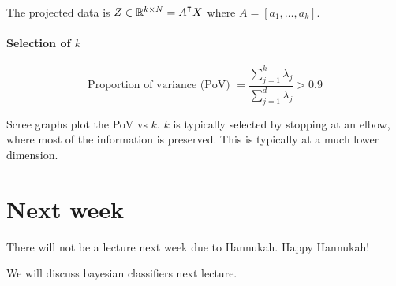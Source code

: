 \documentclass{idc_msc}
\renewcommand{\T}{{\mathpalette\raiseT\intercal}} %
\begin{document}
The projected data is \(Z \in \mathbb{R}^{k \times N} = A^\T X\) where \(A = [a_1,\ldots,a_k]\).

\paragraph{Selection of \(k\)}

\[\text{Proportion of variance (PoV) } = \frac{\sum_{j=1}^k \lambda_j}{\sum_{j=1}^d \lambda_j} > 0.9\]

Scree graphs plot the PoV vs \(k\).
\(k\) is typically selected by stopping at an elbow, where most of the information is preserved.
This is typically at a much lower dimension.

\section{Next week}

There will not be a lecture next week due to Hannukah. Happy Hannukah!

We will discuss bayesian classifiers next lecture.
\end{document}
